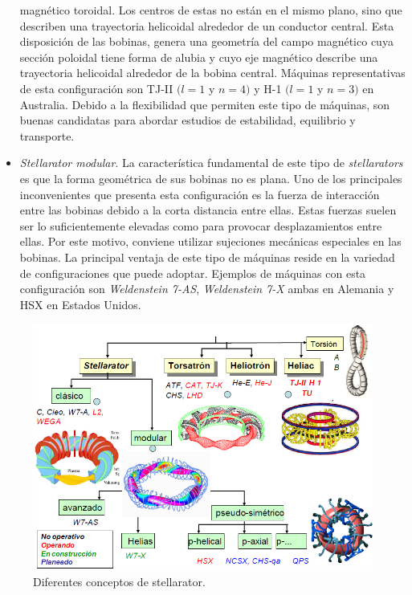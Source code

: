 \begin{itemize}
    magnético toroidal. Los centros de estas no están en el mismo plano, sino que describen
    una trayectoria helicoidal alrededor de un conductor central. Esta disposición de
    las bobinas, genera una geometría del campo magnético cuya sección poloidal tiene forma
    de alubia y cuyo eje magnético describe una trayectoria helicoidal alrededor
    de la bobina central. Máquinas representativas de esta configuración son TJ-II $(l=1$ y
    $n=4)$ y H-1 $(l=1$ y $n=3)$ en Australia.
    Debido a la flexibilidad que permiten este tipo de máquinas, son buenas candidatas
    para abordar estudios de estabilidad, equilibrio y transporte.
    \item \textit{Stellarator modular}. La característica fundamental de este tipo de \textit{stellarators} es que
    la forma geométrica de sus bobinas no es plana. Uno de los principales inconvenientes
    que presenta esta configuración es la fuerza de interacción entre las bobinas debido a la
    corta distancia entre ellas. Estas fuerzas suelen ser lo suficientemente elevadas como
    para provocar desplazamientos entre ellas. Por este motivo, conviene utilizar sujeciones
    mecánicas especiales en las bobinas.
    La principal ventaja de este tipo de máquinas reside en la variedad de configuraciones
    que puede adoptar. Ejemplos de máquinas con esta configuración son \textit{Weldenstein 7-AS},
    \textit{Weldenstein 7-X} ambas en Alemania y HSX en Estados Unidos.
\end{itemize}
\begin{figure}[H]
    \centering
    \includegraphics[scale=0.6]{img/tree.png}
    \caption[Diferentes conceptos de stellarator]{Diferentes conceptos de stellarator.}
    \label{fig:tree}
\end{figure}
